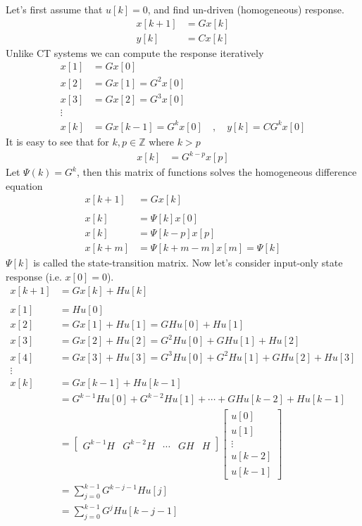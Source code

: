 \documentclass[twoside]{article}
\begin{document}
Let's first assume that $u[k] = 0$, and find un-driven (homogeneous)
response.
%
\begin{align*}
  x[k+1] &= G x[k] \\
  y[k] &= C x[k]
\end{align*}
%
Unlike CT systems we can compute the response iteratively
%
\begin{align*}
  x[1] &= G x[0] 
  \\
  x[2] &= G x[1] = G^2 x[0] 
  \\
  x[3] &= G x[2] = G^3 x[0] 
  \\
  \vdots
  \\
  x[k] &= G x[k-1] = G^k x[0] \quad , \quad y[k] = C G^k x[0]
\end{align*}
%
It is easy to see that for $k , p \in \mathbb{Z}$ where $k > p$
%
\begin{align*}
  x[k] &= G^{k-p} x[p] 
\end{align*}
%
Let $\Psi(k) = G^k$, then this matrix of functions solves the
homogeneous difference equation
%
\begin{align*}
  x[k+1] &= G x[k] 
\\    
\\
  x[k] &=\Psi[k] x[0] 
\\
  x[k] &=\Psi[k-p] x[p] 
\\
 x[k+m] &=\Psi[ k + m - m] x[m] = \Psi[k]
\end{align*}
%
$\Psi[k]$ is called the state-transition matrix.
%
Now let's consider input-only state response (i.e. $x[0] = 0$).
%
\begin{align*}
  x[k+1] &= G x[k] + H u[k] 
  \\
  \\
  x[1] &= H u[0]
  \\
  x[2] &= G x[1] + H u[1] = G H u[0] + H u[1] 
  \\
  x[3] &= G x[2] + H u[2] = G^2 H u[0] + G H u[1] + H u[2]
  \\
  x[4] &= G x[3] + H u[3] = G^3 H u[0] + G^2 H u[1] + G H u[2] + H
         u[3]
  \\
  \vdots
 \\
  x[k] &= G x[k-1] + H u[k-1] \\
         &= G^{k-1} H u[0] + G^{k-2} H u[1] +
         \cdots + G H u[k-2] + H u[k-1]
         \\
         &= \left[ \begin{array}{c|c|c|c|c} G^{k-1} H & G^{k-2} H &
         \cdots & G H & H \end{array} \right]
         \left[ \begin{array}{c}
                  u[0] \\ u[1] \\ \vdots \\ u[k-2] \\ u[k-1]
         \end{array} \right]
         \\
         &= \sum\limits_{j = 0}^{k-1} G^{k-j-1} H u[j]
         \\
         &= \sum\limits_{j = 0}^{k-1} G^{j} H u[k-j-1]
\end{align*}
\end{document}
